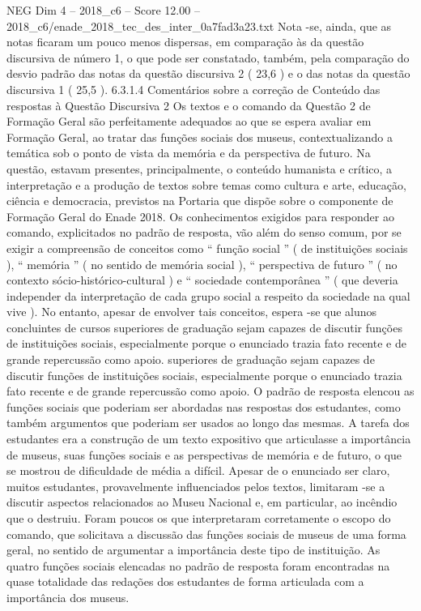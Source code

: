 \begin{textsample}{NEG Dim 4 – 2018\_c6 – Score 12.00 – 2018\_c6/enade\_2018\_tec\_des\_inter\_0a7fad3a23.txt}
Nota -se, ainda, que as notas ficaram um pouco menos dispersas, em comparação às da questão discursiva de número 1, o que pode ser constatado, também, pela comparação do desvio padrão das notas da questão discursiva 2 ( 23,6 ) e o das notas da questão discursiva 1 ( 25,5 ). 6.3.1.4 Comentários sobre a correção de Conteúdo das respostas à Questão Discursiva 2 Os textos e o comando da Questão 2 de Formação Geral são perfeitamente adequados ao que se espera avaliar em Formação Geral, ao tratar das funções sociais dos museus, contextualizando a temática sob o ponto de vista da memória e da perspectiva de futuro.
Na questão, estavam presentes, principalmente, o conteúdo humanista e crítico, a interpretação e a produção de textos sobre temas como cultura e arte, educação, ciência e democracia, previstos na Portaria que dispõe sobre o componente de Formação Geral do Enade 2018.
Os conhecimentos exigidos para responder ao comando, explicitados no padrão de resposta, vão além do senso comum, por se exigir a compreensão de conceitos como “ função social ” ( de instituições sociais ), “ memória ” ( no sentido de memória social ), “ perspectiva de futuro ” ( no contexto sócio-histórico-cultural ) e “ sociedade contemporânea ” ( que deveria independer da interpretação de cada grupo social a respeito da sociedade na qual vive ).
No entanto, apesar de envolver tais conceitos, espera -se que alunos concluintes de cursos superiores de graduação sejam capazes de discutir funções de instituições sociais, especialmente porque o enunciado trazia fato recente e de grande repercussão como apoio. superiores de graduação sejam capazes de discutir funções de instituições sociais, especialmente porque o enunciado trazia fato recente e de grande repercussão como apoio.
O padrão de resposta elencou as funções sociais que poderiam ser abordadas nas respostas dos estudantes, como também argumentos que poderiam ser usados ao longo das mesmas.
A tarefa dos estudantes era a construção de um texto expositivo que articulasse a importância de museus, suas funções sociais e as perspectivas de memória e de futuro, o que se mostrou de dificuldade de média a difícil.
Apesar de o enunciado ser claro, muitos estudantes, provavelmente influenciados pelos textos, limitaram -se a discutir aspectos relacionados ao Museu Nacional e, em particular, ao incêndio que o destruiu.
Foram poucos os que interpretaram corretamente o escopo do comando, que solicitava a discussão das funções sociais de museus de uma forma geral, no sentido de argumentar a importância deste tipo de instituição.
As quatro funções sociais elencadas no padrão de resposta foram encontradas na quase totalidade das redações dos estudantes de forma articulada com a importância dos museus.

\end{textsample}
